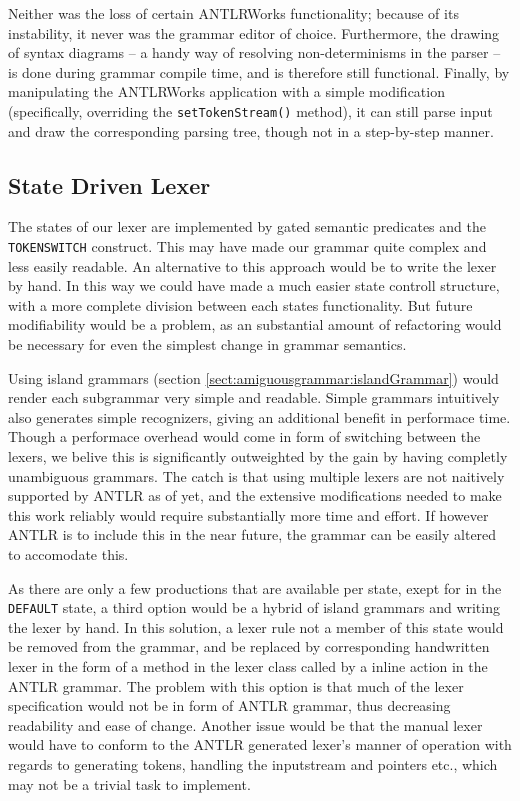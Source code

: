 Neither was the loss of certain ANTLRWorks functionality; because of its
instability, it never was the grammar editor of choice. Furthermore, the
drawing of syntax diagrams -- a handy way of resolving non-determinisms in the
parser -- is done during grammar compile time, and is therefore still
functional. Finally, by manipulating the ANTLRWorks application with a simple
modification (specifically, overriding the \verb!setTokenStream()! method), it
can still parse input and draw the corresponding parsing tree, though not in a
step-by-step manner.

\subsection{State Driven Lexer}
\label{sect:discussion:stateDriven}
The states of our lexer are implemented by gated semantic predicates and the
\verb!TOKENSWITCH! construct. This may have made our grammar quite complex and
less easily readable. An alternative to this approach would be to write the
lexer by hand. In this way we could have made a much easier state controll
structure, with a more complete division between each states functionality.
But future modifiability would be a problem, as an substantial amount of
refactoring would be necessary for even the simplest change in grammar
semantics.

Using island grammars (section \ref{sect:amiguousgrammar:islandGrammar}) would
render each subgrammar very simple and readable. Simple grammars intuitively
also generates simple recognizers, giving an additional benefit in performace
time. Though a performace overhead would come in form of switching between the
lexers, we belive this is significantly outweighted by the gain by having
completly unambiguous grammars. The catch is that using multiple lexers are not
naitively supported by ANTLR as of yet, and the extensive modifications needed
to make this work reliably would require substantially more time and effort. If
however ANTLR is to include this in the near future, the grammar can be easily
altered to accomodate this.

As there are only a few productions that are available per state, exept for in the \verb!DEFAULT! state, a third option would be a hybrid of island grammars and writing the lexer by hand. In this solution, a lexer rule not a member of this state would be removed from the grammar, and be replaced by corresponding handwritten lexer in the form of a method in the lexer class called by a inline action in the ANTLR grammar. The problem with this option is that much of the lexer specification would not be in form of ANTLR grammar, thus decreasing readability and ease of change. Another issue would be that the manual lexer would have to conform to the ANTLR generated lexer's manner of operation with regards to generating tokens, handling the inputstream and pointers etc., which may not be a trivial task to implement.